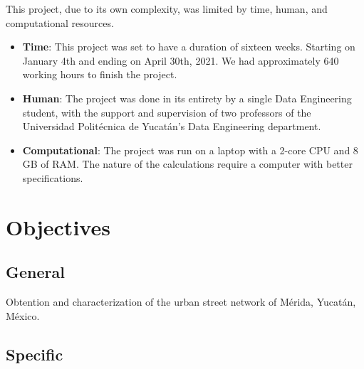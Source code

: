 This project, due to its own complexity, was limited by time, human, and computational resources.

\begin{itemize}
	\item \textbf{Time}: This project was set to have a duration of sixteen weeks. Starting on January 4th and ending on April 30th, 2021. We had approximately 640 working hours to finish the project.
	\item \textbf{Human}: The project was done in its entirety by a single Data Engineering student, with the support and supervision of two professors of the Universidad Politécnica de Yucatán's Data Engineering department.
	\item \textbf{Computational}: The project was run on a laptop with a 2-core CPU and 8 GB of RAM. The nature of the calculations require a computer with better specifications.
\end{itemize}

\section{Objectives}
\subsection {General}
 
Obtention and characterization of the urban street network of Mérida, Yucatán, México.
 
\subsection {Specific}

